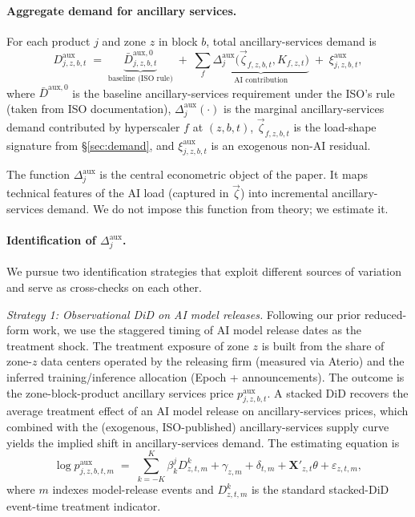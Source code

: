 \documentclass[12pt,letterpaper]{article}
\begin{document}
\paragraph{Aggregate demand for ancillary services.} For each product $j$
and zone $z$ in block $b$, total ancillary-services demand is
\begin{equation}
\label{eq:aux_demand}
D^{\text{aux}}_{j,z,b,t} \;=\;
\underbrace{\bar D^{\text{aux},0}_{j,z,b,t}}_{\text{baseline (ISO rule)}}
\;+\; \sum_f
\underbrace{\Delta^{\text{aux}}_{j}\big(\vec\zeta_{f,z,b,t}, K_{f,z,t}\big)}_{\text{AI contribution}}
\;+\; \xi^{\text{aux}}_{j,z,b,t},
\end{equation}
where $\bar D^{\text{aux},0}$ is the baseline ancillary-services requirement
under the ISO's rule (taken from ISO documentation), $\Delta^{\text{aux}}_j(\cdot)$
is the marginal ancillary-services demand contributed by hyperscaler $f$ at
$(z,b,t)$, $\vec\zeta_{f,z,b,t}$ is the load-shape signature from
\S\ref{sec:demand}, and $\xi^{\text{aux}}_{j,z,b,t}$ is an exogenous
non-AI residual.

The function $\Delta^{\text{aux}}_j$ is the central econometric object of
the paper. It maps technical features of the AI load (captured in
$\vec\zeta$) into incremental ancillary-services demand. We do not impose
this function from theory; we estimate it.

\paragraph{Identification of $\Delta^{\text{aux}}_j$.} We pursue two
identification strategies that exploit different sources of variation and
serve as cross-checks on each other.

\emph{Strategy 1: Observational DiD on AI model releases.} Following our
prior reduced-form work, we use the staggered timing of AI model release
dates as the treatment shock. The treatment exposure of zone $z$ is built
from the share of zone-$z$ data centers operated by the releasing firm
(measured via Aterio) and the inferred training/inference allocation
(Epoch + announcements). The outcome is the zone-block-product ancillary
services price $p^{\text{aux}}_{j,z,b,t}$. A stacked DiD recovers the
average treatment effect of an AI model release on ancillary-services
prices, which combined with the (exogenous, ISO-published) ancillary-services
supply curve yields the implied shift in ancillary-services demand.
The estimating equation is
\begin{equation}
\label{eq:aux_did}
\log p^{\text{aux}}_{j,z,b,t,m} \;=\; \sum_{k=-K}^K \beta^{j}_k D^k_{z,t,m}
+ \gamma_{z,m} + \delta_{t,m} + \mathbf{X}'_{z,t}\theta + \varepsilon_{z,t,m},
\end{equation}
where $m$ indexes model-release events and $D^k_{z,t,m}$ is the standard
stacked-DiD event-time treatment indicator.
\end{document}
